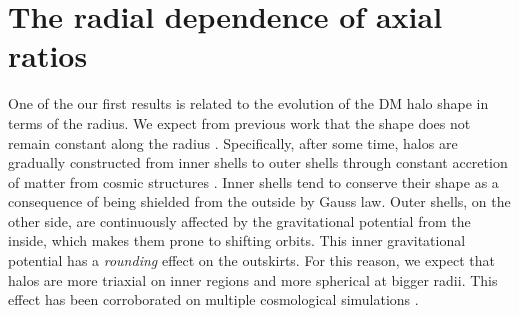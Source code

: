 \section{The radial dependence of axial ratios}
One of the our first results is related to the evolution of the DM halo shape in terms of the radius. We expect from previous work that the shape does not remain constant along the radius \cite{Vera-Ciro_et_al._2011}. Specifically, after some time, halos are gradually constructed from inner shells to outer shells through constant accretion of matter from cosmic structures \cite{Tormen_et_al._1997,Tormen_et_al._1998}. Inner shells tend to conserve their shape as a consequence of being shielded from the outside by Gauss law. Outer shells, on the other side, are continuously affected by the gravitational potential from the inside, which makes them prone to shifting orbits. This inner gravitational potential has a \textit{rounding} effect on the outskirts. For this reason, we expect that halos are more triaxial on inner regions and more spherical at bigger radii. This effect has been corroborated on multiple cosmological simulations \cite{Frenk_et_al._1988,Dubinski_and_Carlberg_1991,Warren_et_al._1992,Cole_and_Lacey_1996,Hayashi_et_al._2007,Bett_et_al._2007,Vera-Ciro_et_al._2011}. \\


